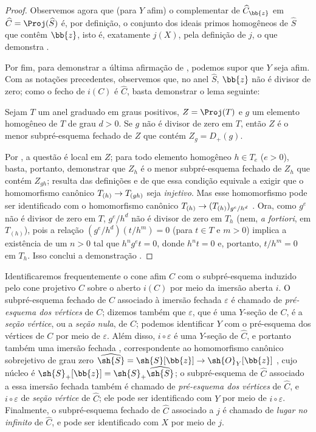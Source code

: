 \documentclass[oneside,10pt]{amsart}
\makeatletter
\newcommand{\ega@arrow}[2]{\mathchoice{#1}{#2}{#2}{#2}}
\renewcommand{\to}{\ega@arrow{\longrightarrow}{\rightarrow}}
\newcommand{\oldpage}[2][]{\marginnote{\normalfont\footnotesize\textbf{#1}~|~#2}\ignorespaces}
\let\EGAOriginalLabel\label
\renewcommand{\label}[1]{\phantomsection\EGAOriginalLabel{#1}}
\makeatother
\begin{document}
\begin{proof}
Observemos agora que (para $Y$ afim) o complementar de $\widehat{C}_{\bb{z}}$ em $\widehat{C}=\Proj(\widehat{S})$
\oldpage[II]{164}
é, por definição, o conjunto dos ideais primos homogêneos de $\widehat{S}$ que contêm $\bb{z}$, isto é, exatamente $j(X)$, pela definição de $j$, o que demonstra .

Por fim, para demonstrar a última afirmação de , podemos supor que $Y$ seja afim.
Com as notações precedentes, observemos que, no anel $\widehat{S}$, $\bb{z}$ não é divisor de zero;
como o fecho de $i(C)$ é $\widehat{C}$, basta demonstrar o lema seguinte:
\begin{lemma}[8.3.2.7]
\label{II.8.3.2.7}
Sejam $T$ um anel graduado em graus positivos, $Z=\Proj(T)$ e $g$ um elemento homogêneo de $T$ de grau $d>0$.
Se $g$ não é divisor de zero em $T$, então $Z$ é o menor subpré-esquema fechado de $Z$ que contém $Z_g=D_+(g)$.
\end{lemma}

Por , a questão é local em $Z$;
para todo elemento homogêneo $h\in T_e$ ($e>0$), basta, portanto, demonstrar que $Z_h$ é o menor subpré-esquema fechado de $Z_h$ que contém $Z_{gh}$;
resulta das definições e de  que essa condição equivale a exigir que o homomorfismo canônico $T_{(h)}\to T_{(gh)}$ seja \emph{injetivo}.
Mas esse homomorfismo pode ser identificado com o homomorfismo canônico $T_{(h)}\to(T_{(h)})_{g^e/h^d}$ .
Ora, como $g^e$ não é divisor de zero em $T$, $g^e/h^d$ não é divisor de zero em $T_h$ (nem, \emph{a fortiori}, em $T_{(h)}$), pois a relação $(g^e/h^d)(t/h^m)=0$ (para $t\in T$ e $m>0$) implica a existência de um $n>0$ tal que $h^ng^et=0$, donde $h^nt=0$ e, portanto, $t/h^m=0$ em $T_h$.
Isso conclui a demonstração .
\end{proof}
\begin{env}[8.3.3]
\label{II.8.3.3}
Identificaremos frequentemente o cone afim $C$ com o subpré-esquema induzido pelo cone projetivo $\widehat{C}$ sobre o aberto $i(C)$ por meio da imersão aberta $i$.
O subpré-esquema fechado de $C$ associado à imersão fechada $\varepsilon$ é chamado de \emph{pré-esquema dos vértices} de $C$;
dizemos também que $\varepsilon$, que é uma $Y$-seção de $C$, é a \emph{seção vértice}, ou a \emph{seção nula}, de $C$;
podemos identificar $Y$ com o pré-esquema dos vértices de $C$ por meio de $\varepsilon$.
Além disso, $i\circ\varepsilon$ é uma $Y$-seção de $\widehat{C}$, e portanto também uma imersão fechada , correspondente ao homomorfismo canônico sobrejetivo de grau zero $\widehat{\sh{S}} = \sh{S}[\bb{z}] \to \sh{O}_Y[\bb{z}]$ , cujo núcleo é $\sh{S}_+[\bb{z}] = \sh{S}_+\widehat{\sh{S}}$;
o subpré-esquema de $\widehat{C}$ associado a essa imersão fechada também é chamado de \emph{pré-esquema dos vértices} de $\widehat{C}$, e $i\circ\varepsilon$ de \emph{seção vértice} de $\widehat{C}$;
ele pode ser identificado com $Y$ por meio de $i\circ\varepsilon$.
Finalmente, o subpré-esquema fechado de $\widehat{C}$ associado a $j$ é chamado de \emph{lugar no infinito} de $\widehat{C}$, e pode ser identificado com $X$ por meio de $j$.
\end{env}
\end{document}
